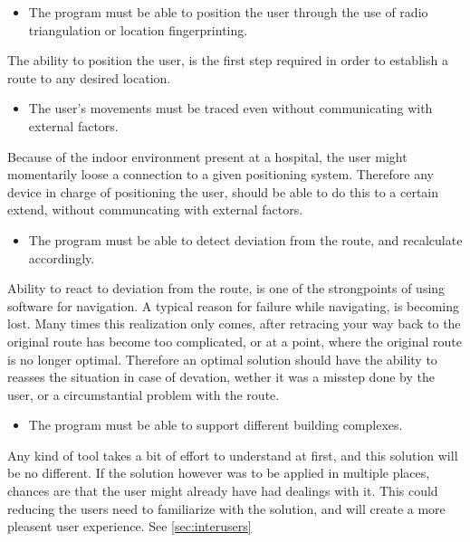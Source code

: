 \begin{itemize}
	\item The program must be able to position the user through the use of radio triangulation or location fingerprinting.
\end{itemize}
The ability to position the user, is the first step required in order to establish a route to any desired location.

\begin{itemize}
	\item The user's movements must be traced even without communicating with external factors.
\end{itemize}
Because of the indoor environment present at a hospital, the user might momentarily loose a connection to a given positioning system. Therefore any device in charge of positioning the user, should be able to do this to a certain extend, without communcating with external factors.

\begin{itemize}
	\item The program must be able to detect deviation from the route, and recalculate accordingly.
\end{itemize}	
Ability to react to deviation from the route, is one of the strongpoints of using software for navigation. A typical reason for failure while navigating, is becoming lost. Many times this realization only comes, after retracing your way back to the original route has become too complicated, or at a point, where the original route is no longer optimal. Therefore an optimal solution should have the ability to reasses the situation in case of devation, wether it was a misstep done by the user, or a circumstantial problem with the route.

\begin{itemize}
	\item The program must be able to support different building complexes.
\end{itemize}
Any kind of tool takes a bit of effort to understand at first, and this solution will be no different. If the solution however was to be applied in multiple places, chances are that the user might already have had dealings with it. This could reducing the users need to familiarize with the solution, and will create a more pleasent user experience. See \cref{sec:interusers}

